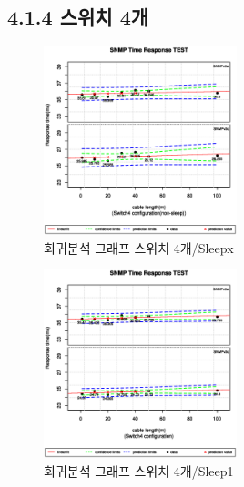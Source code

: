 \documentclass[11pt
  , a4paper
  , article
  , oneside
]{memoir}
\begin{document}
\subsection{4.1.4 스위치 4개}
 \begin{figure}[!htb]
  \centering
  \includegraphics[width=0.5\textwidth]{./images/s4sx.eps}
  \caption{회귀분석 그래프 스위치 4개/Sleepx}
\end{figure}
 \begin{figure}[!htb]
  \centering
  \includegraphics[width=0.5\textwidth]{./images/s4s1.eps}
  \caption{회귀분석 그래프 스위치 4개/Sleep1}
\end{figure}

\clearpage
\end{document}
